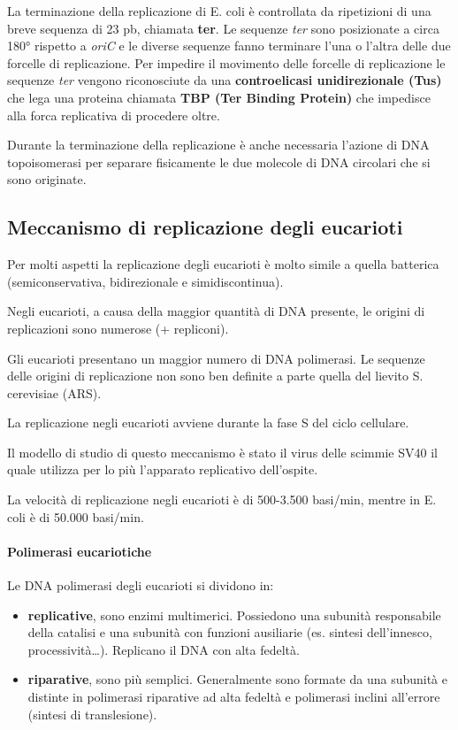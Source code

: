 \documentclass[11pt]{book}
\begin{document}
La terminazione della replicazione di E. coli è controllata da
ripetizioni di una breve sequenza di 23 pb, chiamata \textbf{ter}. Le
sequenze \emph{ter} sono posizionate a circa 180° rispetto a \emph{oriC}
e le diverse sequenze fanno terminare l'una o l'altra delle due forcelle
di replicazione. Per impedire il movimento delle forcelle di
replicazione le sequenze \emph{ter} vengono riconosciute da una
\textbf{controelicasi unidirezionale (Tus)} che lega una proteina
chiamata \textbf{TBP (Ter Binding Protein)} che impedisce alla forca
replicativa di procedere oltre.

Durante la terminazione della replicazione è anche necessaria l'azione
di DNA topoisomerasi per separare fisicamente le due molecole di DNA
circolari che si sono originate.

\subsection{Meccanismo di replicazione degli
eucarioti}\label{meccanismo-di-replicazione-degli-eucarioti}

Per molti aspetti la replicazione degli eucarioti è molto simile a
quella batterica (semiconservativa, bidirezionale e simidiscontinua).

Negli eucarioti, a causa della maggior quantità di DNA presente, le
origini di replicazioni sono numerose (+ repliconi).

Gli eucarioti presentano un maggior numero di DNA polimerasi. Le
sequenze delle origini di replicazione non sono ben definite a parte
quella del lievito S. cerevisiae (ARS).

La replicazione negli eucarioti avviene durante la fase S del ciclo
cellulare.

Il modello di studio di questo meccanismo è stato il virus delle scimmie
SV40 il quale utilizza per lo più l'apparato replicativo dell'ospite.

La velocità di replicazione negli eucarioti è di 500-3.500 basi/min,
mentre in E. coli è di 50.000 basi/min.

\paragraph{Polimerasi eucariotiche}\label{polimerasi-eucariotiche}

Le DNA polimerasi degli eucarioti si dividono in:

\begin{itemize}
\itemsep1pt\parskip0pt
\item
  \textbf{replicative}, sono enzimi multimerici. Possiedono una subunità
  responsabile della catalisi e una subunità con funzioni ausiliarie
  (es. sintesi dell'innesco, processività\ldots{}). Replicano il DNA con
  alta fedeltà.
\item
  \textbf{riparative}, sono più semplici. Generalmente sono formate da
  una subunità e distinte in polimerasi riparative ad alta fedeltà e
  polimerasi inclini all'errore (sintesi di translesione).
\end{itemize}
\end{document}
